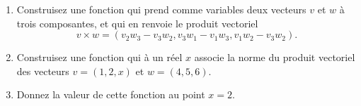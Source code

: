 \begin{exercice}\label{exoMatlab0035}

\begin{enumerate}
\item Construisez une fonction qui prend comme variables deux vecteurs $v$ et $w$ à trois composantes, et qui en renvoie le produit vectoriel
\[ v\times w = (v_2w_3-v_3w_2, v_3w_1-v_1w_3,v_1w_2-v_3w_2) . \]
\item Construisez une fonction qui à un réel $x$ associe la norme du produit vectoriel des vecteurs $v=(1, 2, x)$ et $w=(4,5,6)$.
\item Donnez la valeur de cette fonction au point $x=2$.
\end{enumerate}

\end{exercice}
